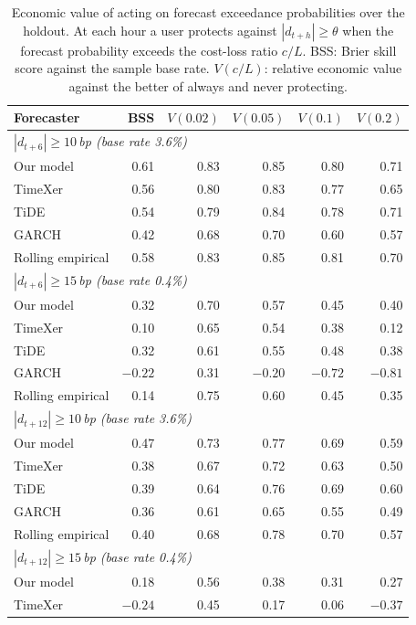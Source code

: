 \begin{table}[pos=!htbp,align=\centering]
\centering
\caption{Economic value of acting on forecast exceedance probabilities over the holdout. At each hour a user protects against $|d_{t+h}|\geq\theta$ when the forecast probability exceeds the cost-loss ratio $c/L$. BSS: Brier skill score against the sample base rate. $V(c/L)$: relative economic value against the better of always and never protecting.}
\label{tab:cl_forecaster}
\small
\begin{tabular}{lrrrrr}
\toprule
Forecaster & BSS & $V(0.02)$ & $V(0.05)$ & $V(0.1)$ & $V(0.2)$ \\
\midrule
\multicolumn{6}{l}{\emph{$|d_{t+6}|\geq10$\,bp (base rate 3.6\%)}} \\
Our model & 0.61 & 0.83 & 0.85 & 0.80 & 0.71 \\
TimeXer & 0.56 & 0.80 & 0.83 & 0.77 & 0.65 \\
TiDE & 0.54 & 0.79 & 0.84 & 0.78 & 0.71 \\
GARCH & 0.42 & 0.68 & 0.70 & 0.60 & 0.57 \\
Rolling empirical & 0.58 & 0.83 & 0.85 & 0.81 & 0.70 \\
\multicolumn{6}{l}{\emph{$|d_{t+6}|\geq15$\,bp (base rate 0.4\%)}} \\
Our model & 0.32 & 0.70 & 0.57 & 0.45 & 0.40 \\
TimeXer & 0.10 & 0.65 & 0.54 & 0.38 & 0.12 \\
TiDE & 0.32 & 0.61 & 0.55 & 0.48 & 0.38 \\
GARCH & $-0.22$ & 0.31 & $-0.20$ & $-0.72$ & $-0.81$ \\
Rolling empirical & 0.14 & 0.75 & 0.60 & 0.45 & 0.35 \\
\multicolumn{6}{l}{\emph{$|d_{t+12}|\geq10$\,bp (base rate 3.6\%)}} \\
Our model & 0.47 & 0.73 & 0.77 & 0.69 & 0.59 \\
TimeXer & 0.38 & 0.67 & 0.72 & 0.63 & 0.50 \\
TiDE & 0.39 & 0.64 & 0.76 & 0.69 & 0.60 \\
GARCH & 0.36 & 0.61 & 0.65 & 0.55 & 0.49 \\
Rolling empirical & 0.40 & 0.68 & 0.78 & 0.70 & 0.57 \\
\multicolumn{6}{l}{\emph{$|d_{t+12}|\geq15$\,bp (base rate 0.4\%)}} \\
Our model & 0.18 & 0.56 & 0.38 & 0.31 & 0.27 \\
TimeXer & $-0.24$ & 0.45 & 0.17 & 0.06 & $-0.37$ \\

\end{tabular}
\end{table}
